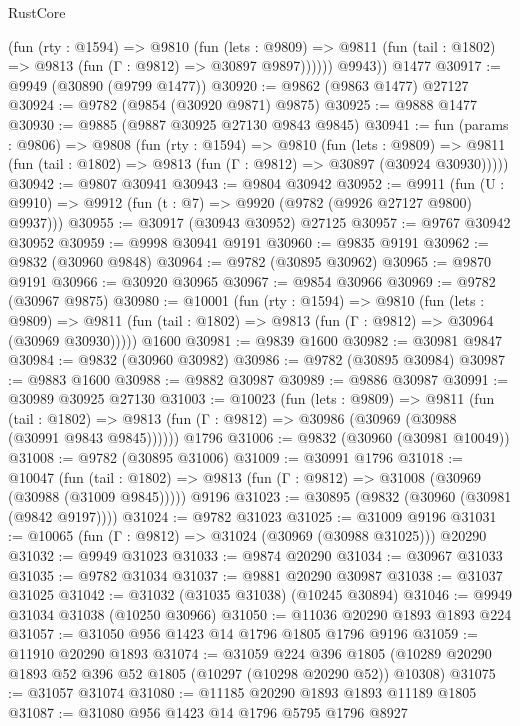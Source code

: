 \begin{lexlean}{RustCore}
\begin{coremodule}
            (fun (rty : @1594) =>
            @9810
              (fun (lets : @9809) =>
              @9811 (fun (tail : @1802) => @9813 (fun (Γ : @9812) => @30897 @9897))))))
        @9943))
    @1477
@30917 := @9949 (@30890 (@9799 @1477))
@30920 := @9862 (@9863 @1477) @27127
@30924 := @9782 (@9854 (@30920 @9871) @9875)
@30925 := @9888 @1477
@30930 := @9885 (@9887 @30925 @27130 @9843 @9845)
@30941 := fun (params : @9806) =>
  @9808
    (fun (rty : @1594) =>
    @9810
      (fun (lets : @9809) =>
      @9811 (fun (tail : @1802) => @9813 (fun (Γ : @9812) => @30897 (@30924 @30930)))))
@30942 := @9807 @30941
@30943 := @9804 @30942
@30952 := @9911
    (fun (U : @9910) => @9912 (fun (t : @7) => @9920 (@9782 (@9926 @27127 @9800) @9937)))
@30955 := @30917 (@30943 @30952) @27125
@30957 := @9767 @30942 @30952
@30959 := @9998 @30941 @9191
@30960 := @9835 @9191
@30962 := @9832 (@30960 @9848)
@30964 := @9782 (@30895 @30962)
@30965 := @9870 @9191
@30966 := @30920 @30965
@30967 := @9854 @30966
@30969 := @9782 (@30967 @9875)
@30980 := @10001
    (fun (rty : @1594) =>
    @9810
      (fun (lets : @9809) =>
      @9811 (fun (tail : @1802) => @9813 (fun (Γ : @9812) => @30964 (@30969 @30930)))))
    @1600
@30981 := @9839 @1600
@30982 := @30981 @9847
@30984 := @9832 (@30960 @30982)
@30986 := @9782 (@30895 @30984)
@30987 := @9883 @1600
@30988 := @9882 @30987
@30989 := @9886 @30987
@30991 := @30989 @30925 @27130
@31003 := @10023
    (fun (lets : @9809) =>
    @9811
      (fun (tail : @1802) =>
      @9813 (fun (Γ : @9812) => @30986 (@30969 (@30988 (@30991 @9843 @9845))))))
    @1796
@31006 := @9832 (@30960 (@30981 @10049))
@31008 := @9782 (@30895 @31006)
@31009 := @30991 @1796
@31018 := @10047
    (fun (tail : @1802) => @9813 (fun (Γ : @9812) => @31008 (@30969 (@30988 (@31009 @9845)))))
    @9196
@31023 := @30895 (@9832 (@30960 (@30981 (@9842 @9197))))
@31024 := @9782 @31023
@31025 := @31009 @9196
@31031 := @10065 (fun (Γ : @9812) => @31024 (@30969 (@30988 @31025))) @20290
@31032 := @9949 @31023
@31033 := @9874 @20290
@31034 := @30967 @31033
@31035 := @9782 @31034
@31037 := @9881 @20290 @30987
@31038 := @31037 @31025
@31042 := @31032 (@31035 @31038) (@10245 @30894)
@31046 := @9949 @31034 @31038 (@10250 @30966)
@31050 := @11036 @20290 @1893 @1893 @224
@31057 := @31050 @956 @1423 @14 @1796 @1805 @1796 @9196
@31059 := @11910 @20290 @1893
@31074 := @31059
    @224
    @396
    @1805
    (@10289 @20290 @1893 @52 @396 @52 @1805 (@10297 (@10298 @20290 @52)) @10308)
@31075 := @31057 @31074
@31080 := @11185 @20290 @1893 @1893 @11189 @1805
@31087 := @31080 @956 @1423 @14 @1796 @5795 @1796 @8927

\end{coremodule}
\end{lexlean}
